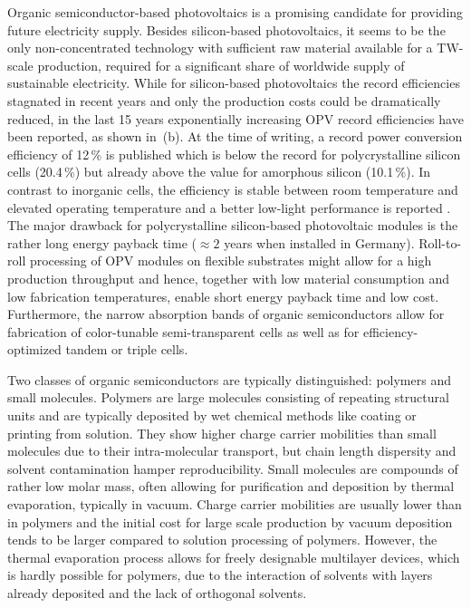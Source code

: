 Organic semiconductor-based photovoltaics is a promising candidate for providing future electricity supply. Besides silicon-based photovoltaics, it seems to be the only non-concentrated technology with sufficient raw material available for a TW-scale production\cite{Feltrin2008}, required for a significant share of worldwide supply of sustainable electricity.
While for silicon-based photovoltaics the record efficiencies stagnated in recent years and only the production costs could be dramatically reduced, in the last 15 years exponentially increasing OPV record efficiencies have been reported, as shown in \,(b).
%
At the time of writing, a record power conversion efficiency of 12\,\%\cite{Heliatek12.0}
is published which is below the record for polycrystalline silicon cells (20.4\,\%)\cite{SolarCellEff41} but already above the value for amorphous silicon (10.1\,\%)\cite{SolarCellEff41}.
In contrast to inorganic cells, the efficiency is stable between room temperature and elevated operating temperature and a better low-light performance is reported \cite{Riede2011,Heliatek12.0}.
%
The major drawback for polycrystalline silicon-based photovoltaic modules is the rather long energy payback time (\eg $\approx 2$ years when installed in Germany\cite{PV-Fakten201303}). Roll-to-roll processing of OPV modules on flexible substrates might allow for a high production throughput and hence, together with low material consumption and low fabrication temperatures, enable short energy payback time and low cost\cite{Anctil2012}.
Furthermore, the narrow absorption bands of organic semiconductors allow for fabrication of color-tunable semi-transparent cells as well as for efficiency-optimized tandem or triple cells\cite{Riede2011,Heliatek12.0}.

Two classes of organic semiconductors are typically distinguished: polymers and small molecules.
Polymers are large molecules consisting of repeating structural units and are typically deposited by wet chemical methods like coating or printing from solution. They show higher charge carrier mobilities than small molecules due to their intra-molecular transport, but chain length dispersity and solvent contamination hamper reproducibility.
Small molecules are compounds of rather low molar mass, often allowing for purification and deposition by thermal evaporation, typically in vacuum. Charge carrier mobilities are usually lower than in polymers and the initial cost for large scale production by vacuum deposition tends to be larger compared to solution processing of polymers. However, the thermal evaporation process allows for freely designable multilayer devices, which is hardly possible for polymers, due to the interaction of solvents with layers already deposited and the lack of orthogonal solvents.

